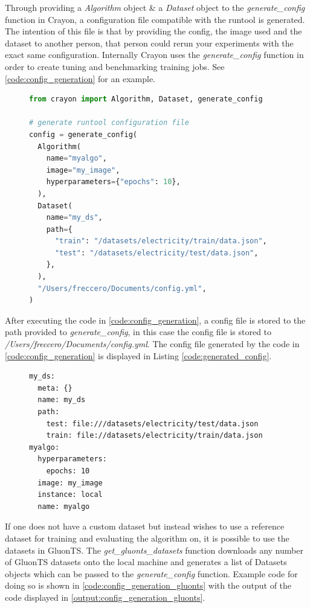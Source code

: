 Through providing a \textit{Algorithm} object \& a \textit{Dataset} object to the \textit{generate\_config} function in Crayon, a configuration file compatible with the runtool is generated. The intention of this file is that by providing the config, the image used and the dataset to another person, that person could rerun your experiments with the exact same configuration. Internally Crayon uses the \textit{generate\_config} function in order to create tuning and benchmarking training jobs. See \ref{code:config_generation} for an example.
\begin{figure}
  \begin{lstlisting}[language=Python, label={code:config_generation}, caption={Config generation using Crayon}]
from crayon import Algorithm, Dataset, generate_config

# generate runtool configuration file
config = generate_config(
  Algorithm(
    name="myalgo",
    image="my_image",
    hyperparameters={"epochs": 10},
  ),
  Dataset(
    name="my_ds",
    path={
      "train": "/datasets/electricity/train/data.json",
      "test": "/datasets/electricity/test/data.json",
    },
  ),
  "/Users/freccero/Documents/config.yml",
)
\end{lstlisting}
\end{figure}

After executing the code in \ref{code:config_generation}, a config file is stored to the path provided to \textit{generate\_config}, in this case the config file is stored to \textit{/Users/freccero/Documents/config.yml}. The config file generated by the code in \ref{code:config_generation} is displayed in Listing \ref{code:generated_config}.
\begin{figure}
  \begin{lstlisting}[label={code:generated_config}, caption={Generated configurations file.}]
my_ds:
  meta: {}
  name: my_ds
  path:
    test: file:///datasets/electricity/test/data.json
    train: file://datasets/electricity/train/data.json
myalgo:
  hyperparameters:
    epochs: 10
  image: my_image
  instance: local
  name: myalgo
\end{lstlisting}
\end{figure}


If one does not have a custom dataset but instead wishes to use a reference dataset for training and evaluating the algorithm on, it is possible to use the datasets in GluonTS. The \textit{get\_gluonts\_datasets} function downloads any number of GluonTS datasets onto the local machine and generates a list of Datasets objects which can be passed to the  \textit{generate\_config} function. Example code for doing so is shown in \ref{code:config_generation_gluonts} with the output of the code displayed in \ref{output:config_generation_gluonts}.


